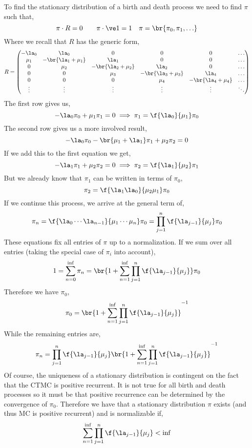 \documentclass{article}
\begin{document}
    To find the stationary distribution of a birth and death process we need to find $\pi$ such that,
    \[ \pi \cdot R = 0 \qquad \pi \cdot \ve 1 = 1 \quad \pi = \br{\pi_0, \pi_1, \ldots} \]
    Where we recall that $R$ has the generic form,
    \[ R = \begin{pmatrix}
        - \la_0 & \la_0 & 0 & 0 & 0 & \ldots \\
        \mu_1 & -\br{\la_1 + \mu_1} & \la_1 & 0 & 0 & \ldots \\
        0 & \mu_2 & -\br{\la_2 + \mu_2} & \la_2 & 0 & \ldots \\
        0 & 0 & \mu_3 & -\br{\la_3 + \mu_3} & \la_4 & \ldots \\
        0 & 0 & 0 & \mu_4 & -\br{\la_4 + \mu_4} & \ldots \\
        \vdots & \vdots & \vdots & \vdots & \vdots & \ddots \\
    \end{pmatrix} \]
    The first row gives us,
    \[ -\la_0 \pi_0 + \mu_1 \pi_1 = 0 \implies \pi_1 = \f{\la_0}{\mu_1} \pi_0 \]
    The second row gives us a more involved result,
    \[ -\la_0 \pi_0 - \br{\mu_1 + \la_1} \pi_1 + \mu_2 \pi_2 = 0 \]
    If we add this to the first equation we get,
    \[ -\la_1 \pi_1 + \mu_2 \pi_2 = 0 \implies \pi_2 = \f{\la_1}{\mu_2} \pi_1 \]
    But we already know that $\pi_1$ can be written in terms of $\pi_0$,
    \[ \pi_2 = \f{\la_1 \la_0}{\mu_2 \mu_1} \pi_0 \]
    If we continue this process, we arrive at the general term of,
    \[ \pi_n = \f{\la_0 \cdots \la_{n-1}}{\mu_1 \cdots \mu_n} \pi_0 = \prod_{j=1}^{n}\f{\la_{j-1}}{\mu_j} \pi_0 \]
    These equations fix all entries of $\pi$ up to a normalization. If we sum over all entries (taking the special case of $\pi_i$ into account),
    \[ 1 = \sum_{n=0}^{\inf} \pi_n = \br{1+ \sum_{n=1}^{\inf} \prod_{j=1}^{n}\f{\la_{j-1}}{\mu_j}} \pi_0 \]
    Therefore we have $\pi_0$,
    \[ \pi_0 = \br{1+ \sum_{n=1}^{\inf} \prod_{j=1}^{n}\f{\la_{j-1}}{\mu_j}}^{-1} \]
    While the remaining entries are,
    \[ \pi_n = \prod_{j=1}^{n}\f{\la_{j-1}}{\mu_j}\br{1+ \sum_{n=1}^{\inf} \prod_{j=1}^{n}\f{\la_{j-1}}{\mu_j}}^{-1} \]
    Of course, the uniqueness of a stationary distribution is contingent on the fact that the CTMC is positive recurrent. It is not true for all birth and death processes so it must be that positive recurrence can be determined by the convergence of $\pi_0$. Therefore we have that a stationary distribution $\pi$ exists (and thus MC is positive recurrent) and is normalizable if,
    \[ \sum_{n=1}^{\inf} \prod_{j=1}^{n}\f{\la_{j-1}}{\mu_j} < \inf \]
\end{document}
